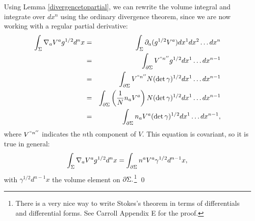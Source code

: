 Using Lemma \ref{divergencetopartial}, we %
can rewrite the volume integral and integrate over $dx^n$ using the ordinary divergence theorem, since we are now working with a regular partial derivative:
\begin{eqnarray*}
\int_\Sigma \nabla_a V^a g^{1/2} d^n x&=&\int_\Sigma \partial_a(g^{1/2} V^a) dx^1 dx^2 \ldots dx^n\\
&=& \int_{\partial \Sigma} V^{``n''} g^{1/2} dx^1 \ldots dx^{n-1}\\
&=& \int_{\partial\Sigma} V^{``n''}N(\det \gamma)^{1/2} dx^1 \ldots dx^{n-1}\\
&=& \int_{\partial\Sigma} \left(\frac{1}{N} n_a V^a\right) N(\det \gamma)^{1/2} dx^1 \ldots dx^{n-1}\\
&=& \int_{\partial\Sigma} n_a V^a (\det \gamma)^{1/2} dx^1 \ldots dx^{n-1},
\end{eqnarray*}
where $V^{``n''}$ indicates the $n$th component of $V$.
This equation is covariant, so it is true in general:
$$\int_\Sigma \nabla_a V^a g^{1/2} d^n x = \int_{\partial \Sigma} n^a V^a \gamma^{1/2} d^{n-1}x,$$ with $\gamma^{1/2}d^{n-1}x$ the volume element on $\partial \Sigma.$\footnote{There is a very nice way to write Stokes's theorem in terms of differentials and differential forms. See Carroll Appendix E for the proof.} \qed